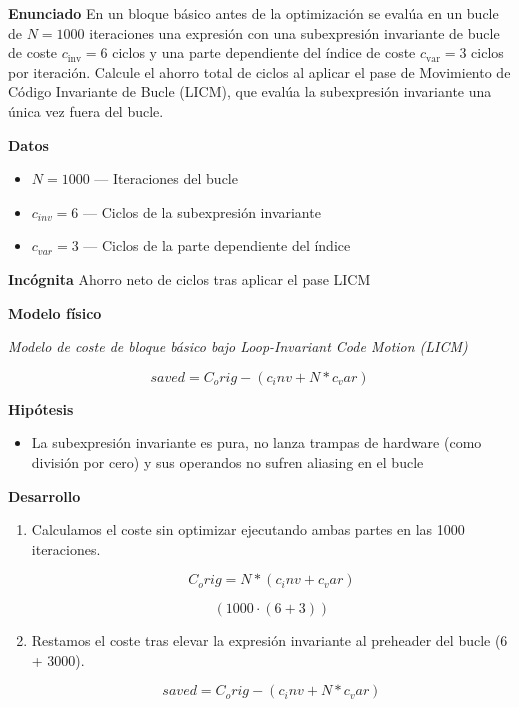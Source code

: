 \documentclass{book}
\begin{document}
\begin{tcolorbox}[title={Problema resuelto}, studiumworked, breakable]

\noindent\textbf{Enunciado}
En un bloque básico antes de la optimización se evalúa en un bucle de \(N = 1000\) iteraciones una expresión con una subexpresión invariante de bucle de coste \(c_{\text{inv}} = 6\) ciclos y una parte dependiente del índice de coste \(c_{\text{var}} = 3\) ciclos por iteración. Calcule el ahorro total de ciclos al aplicar el pase de Movimiento de Código Invariante de Bucle (LICM), que evalúa la subexpresión invariante una única vez fuera del bucle.

\noindent\textbf{Datos}
\begin{itemize}
\item $N = 1000$ — Iteraciones del bucle
\item $c_{inv} = 6$ — Ciclos de la subexpresión invariante
\item $c_{var} = 3$ — Ciclos de la parte dependiente del índice
\end{itemize}

\noindent\textbf{Incógnita}
Ahorro neto de ciclos tras aplicar el pase LICM

\noindent\textbf{Modelo físico}

\noindent\textit{Modelo de coste de bloque básico bajo Loop-Invariant Code Motion (LICM)}

\[
saved = C_orig - (c_inv + N * c_var)
\]

\noindent\textbf{Hipótesis}
\begin{itemize}
\item La subexpresión invariante es pura, no lanza trampas de hardware (como división por cero) y sus operandos no sufren aliasing en el bucle
\end{itemize}

\noindent\textbf{Desarrollo}
\begin{enumerate}
\item
Calculamos el coste sin optimizar ejecutando ambas partes en las 1000 iteraciones.

\[
C_orig = N * (c_inv + c_var)
\]

\[
\left(1000\cdot \left(6+3\right)\right)
\]
\item
Restamos el coste tras elevar la expresión invariante al preheader del bucle (6 + 3000).

\[
saved = C_orig - (c_inv + N * c_var)
\]


\end{enumerate}
\end{tcolorbox}
\end{document}
